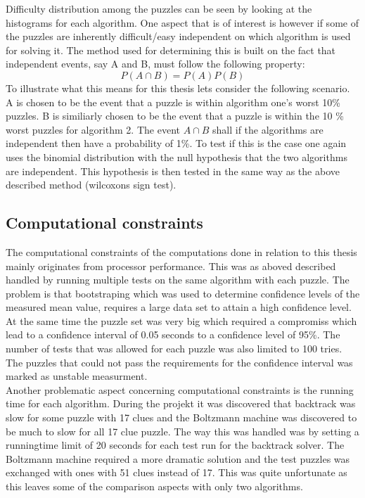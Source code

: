 \documentclass[a4paper,11pt]{kth-mag}
\begin{document}
Difficulty distribution among the puzzles can be seen by looking at the histograms for each algorithm.
One aspect that is of interest is however if some of the puzzles are inherently difficult/easy independent on which algorithm is used for solving it.
The method used for determining this is built on the fact that independent events, say A and B, must follow the following property:
\[
P(A \cap B) = P(A) P(B)
\] 
To illustrate what this means for this thesis lets consider the following scenario.
A is chosen to be the event that a puzzle is within algorithm one's worst 10\% puzzles.
B is similiarly chosen to be the event that a puzzle is within the 10 \% worst puzzles for algorithm 2.
The event $A \cap B$ shall if the algorithms are independent then have a probability of 1\%.
To test if this is the case one again uses the binomial distribution with the null hypothesis that the two algorithms are independent.
This hypothesis is then tested in the same way as the above described method (wilcoxons sign test).

\FloatBarrier
\subsection{Computational constraints}
The computational constraints of the computations done in relation to this thesis mainly originates from processor performance.
This was as aboved described handled by running multiple tests on the same algorithm with each puzzle.
The problem is that bootstraping which was used to determine confidence levels of the measured mean value, requires a large data set to attain a high confidence level. 
At the same time the puzzle set was very big which required a compromiss which lead to a confidence interval of 0.05 seconds to a confidence level of 95\%. The number of tests that was allowed for each puzzle was also limited to 100 tries.
The puzzles that could not pass the requirements for the confidence interval was marked as unstable measurment.
\\
Another problematic aspect concerning computational constraints is the running time for each algorithm.
During the projekt it was discovered that backtrack was slow for some puzzle with 17 clues and the Boltzmann machine was discovered to be much to slow for all 17 clue puzzle.
The way this was handled was by setting a runningtime limit of 20 seconds for each test run for the backtrack solver.
The Boltzmann machine required a more dramatic solution and the test puzzles was exchanged with ones with 51 clues instead of 17. 
This was quite unfortunate as this leaves some of the comparison aspects with only two algorithms.
\end{document}

